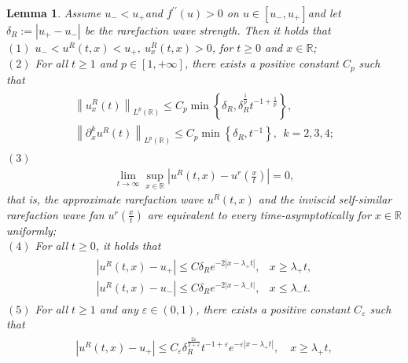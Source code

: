 \documentclass[10pt,reqno]{amsart}
\numberwithin{equation}{section}
\newtheorem{lemma}[theorem]{Lemma}
\begin{document}
	\begin{lemma}\label{lem1}
		Assume \( u_{-} < u_{+} \)and \( f^{\prime \prime}(u) > 0 \) on \( u \in\left[u_{-}, u_{+}\right] \)and let \( \delta_{R}:=\left|u_{+}-u_{-}\right| \) be the rarefaction wave strength. Then it holds that\\
		$(1)$ \( u_{-} < u^{R}(t, x) < u_{+}, \ u_{x}^{R}(t, x) > 0 \), for \( t \geq 0 \) and \( x \in \mathbb{R} \);\\
		$(2)$ For all \( t \geq 1 \) and \( p \in[1,+\infty] \), there exists a positive constant \( C_{p} \) such that
		\begin{align*}
			\begin{array}{l}
				\left\|u_{x}^{R}(t)\right\|_{L^{p}(\mathbb{R})} \leq C_{p} \min \left\{\delta_{R}, \delta_{R}^{\frac{1}{p}} t^{-1+\frac{1}{p}}\right\}, \\
				\left\|\partial_{x}^{k}u^{R}(t)\right\|_{L^{p}(\mathbb{R})} \leq C_{p} \min \left\{\delta_{R}, t^{-1}\right\},\ \ k=2,3,4;
			\end{array}
		\end{align*}
		$(3)$ 
		\begin{align*}
			\lim_{t \to \infty} \sup_{x \in \mathbb{R}}\left|u^{R}(t, x)-u^{r}\left(\frac{x}{t}\right)\right|=0,
		\end{align*}
		that is, the approximate rarefaction wave \( u^{R}(t, x) \) and the inviscid self-similar rarefaction wave fan \( u^{r}\left(\frac{x}{t}\right) \) are equivalent to every time-asymptotically for \( x \in \mathbb{R} \) uniformly;\\
		$(4)$ For all \( t \geq 0 \), it holds that
		\begin{align*}
			\begin{array}{ll}
				\left|u^{R}(t, x)-u_{+}\right| \leq C \delta_{R} e^{-2\left|x-\lambda_{+} t\right|}, & x \geq \lambda_{+} t, \\
				\left|u^{R}(t, x)-u_{-}\right| \leq C \delta_{R} e^{-2\left|x-\lambda_{-} t\right|}, & x \leq \lambda_{-} t.
			\end{array}
		\end{align*}
		$(5)$ For all \( t \geq 1 \) and any \( \varepsilon \in(0,1) \), there exists a positive constant \( C_{\varepsilon} \) such that
		\begin{align*}
			\begin{array}{l}
				\left|u^{R}(t, x)-u_{+}\right| \leq C_{\varepsilon} \delta_{R}^{\frac{2 \varepsilon}{2+\varepsilon}} t^{-1+\varepsilon} e^{-\varepsilon\left|x-\lambda_{+} t\right|}, \quad x \geq \lambda_{+} t, \\

\end{array}
\end{align*}
\end{lemma}
\end{document}
